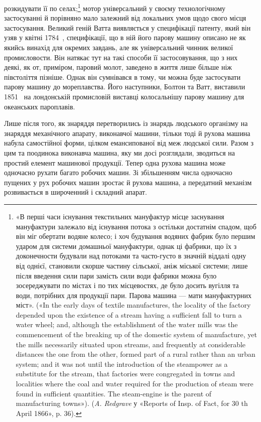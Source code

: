 розкидувати її по селах;\footnote{
«В перші часи існування текстильних мануфактур місце заснування
мануфактури залежало від існування потока з остільки достатнім
спадом, щоб він міг обертати водяне колесо; і хоч будування водяних
фабрик було першим ударом для системи домашньої мануфактури, однак
ці фабрики, що їх з доконечности будували над потоками та часто-густо
в значній віддалі одну від однієї, становили скорше частину сільської, аніж
міської системи; лише після введення сили пари замість сили води фабрики
можна було зосереджувати по містах і по тих місцевостях, де було досить
вугілля та води, потрібних для продукції пари. Парова машина — мати
мануфактурних міст». («In the early days of textile manufactures, the locality
of the factory depended upon the existence of a stream having a sufficient
fall to turn a water wheel; and, although the establishment of the water
mills was the commencement of the breaking up of the domestic system of
manufacture, yet the mills necessarily situated upon streams, and frequently
at considerable distances the one from the other, formed part of a rural rather
than an urban system; and it was not until the introduction of the steampower
as a substitute for the stream, that factories were congregated in towns and
localities where the coal and water required for the production of steam were
found in sufficient quantities. The steam-engine is the parent of manufacturing
towns»). (\emph{A. Redgrave} у «Reports of Insp. of Fact, for 30 th
April 1866», p. 36).
} мотор універсальний у своєму технологічному
застосуванні й порівняно мало залежний від локальних
умов щодо свого місця застосування. Великий геній Ватта
виявляється у специфікації патенту, який він узяв у квітні 1784~,
специфікації, що в ній його парову машину описано не як якийсь
винахід для окремих завдань, але як універсальний чинник
великої промисловости. Він натякає тут на такі способи її застосовування,
що з них деякі, як от, приміром, паровий молот,
заведено в життя лише більше ніж півстоліття пізніше. Однак
він сумнівався в тому, чи можна буде застосувати парову машину
до мореплавства. Його наступники, Болтон та Ватт, виставили
1851~ на лондонській промисловій виставці колосальнішу парову
машину для океанських пароплавів.

Лише після того, як знаряддя перетворились із знарядь людського
організму на знаряддя механічного апарату, виконавчої
машини, тільки тоді й рухова машина набула самостійної форми,
цілком емансипованої від меж людської сили. Разом з цим та
поодинока виконавча машина, яку ми досі розглядали, зводиться
на простий елемент машинової продукції. Тепер одна рухова
машина може одночасно рухати багато робочих машин. Зі збільшенням
числа одночасно пущених у рух робочих машин зростає
й рухова машина, а передатний механізм розвивається в широченний
і складний апарат.

